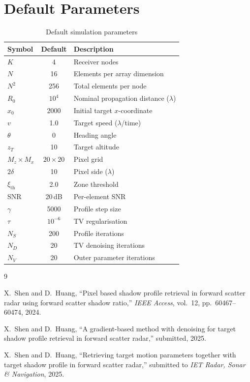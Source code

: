 \documentclass[11pt,a4paper]{article}
\begin{document}
\section{Default Parameters}
\label{sec:params}

\begin{table}[H]
\centering
\caption{Default simulation parameters}
\label{tab:params}
\begin{tabular}{@{}lcl@{}}
\toprule
\textbf{Symbol} & \textbf{Default} & \textbf{Description} \\
\midrule
$K$ & 4 & Receiver nodes \\
$N$ & 16 & Elements per array dimension \\
$N^2$ & 256 & Total elements per node \\
$R_0$ & $10^4$ & Nominal propagation distance ($\lambda$) \\
$x_0$ & 2000 & Initial target $x$-coordinate \\
$v$ & 1.0 & Target speed ($\lambda$/time) \\
$\theta$ & 0 & Heading angle \\
$z_T$ & 10 & Target altitude \\
$M_z{\times}M_x$ & $20{\times}20$ & Pixel grid \\
$2\delta$ & 10 & Pixel side ($\lambda$) \\
$\xi_{\mathrm{th}}$ & 2.0 & Zone threshold \\
SNR & 20\,dB & Per-element SNR \\
\midrule
$\gamma$ & 5000 & Profile step size \\
$\tau$ & $10^{-6}$ & TV regularisation \\
$N_S$ & 200 & Profile iterations \\
$N_D$ & 20 & TV denoising iterations \\
$N_V$ & 20 & Outer parameter iterations \\
\bottomrule
\end{tabular}
\end{table}

\begin{thebibliography}{9}

X.~Shen and D.~Huang,
``Pixel based shadow profile retrieval in forward scatter radar using
forward scatter shadow ratio,''
\emph{IEEE Access}, vol.~12, pp.~60467--60474, 2024.

X.~Shen and D.~Huang,
``A gradient-based method with denoising for target shadow profile
retrieval in forward scatter radar,''
submitted, 2025.

X.~Shen and D.~Huang,
``Retrieving target motion parameters together with target shadow
profile in forward scatter radar,''
submitted to \emph{IET Radar, Sonar \& Navigation}, 2025.

\end{thebibliography}
\end{document}
